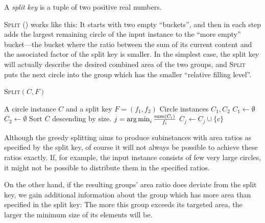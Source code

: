 \documentclass[a4paper,style=print,bibliography=totoc,nexus,lnum,extramargin]{tubsbook}
\begin{document}
\begin{definition}
    A \emph{split key} is a tuple of two positive real numbers.
\end{definition}

\textsc{Split} () works like this: It starts with two empty “buckets”, and then in each step adds the largest remaining circle of the input instance to the “more empty” bucket---the bucket where the ratio between the sum of its current content and the associated factor of the split key is smaller.
In the simplest case, the split key will actually describe the desired combined area of the two groups, and \textsc{Split} puts the next circle into the group which has the smaller “relative filling level”.

\begin{algorithm}
    \caption{\textsc{Split}$(C,F)$}
    \label{alg:split}
    \begin{algorithmic}
        \Require A circle instance $C$ and a split key $F = (f_1, f_2)$
        \Ensure Circle instances $C_1, C_2$
        \State $C_1 \gets \emptyset$
        \State $C_2 \gets \emptyset$
        \State Sort $C$ descending by size.
            \State $j = \operatorname*{arg\,min}_{i} \frac{\operatorname{sum}(C_i)}{f_i}$
            \State $C_j \gets C_j \cup \{c\}$
        \EndFor
    \end{algorithmic}
\end{algorithm}

Although the greedy splitting aims to produce subinstances with area ratios as specified by the split key, of course it will not always be possible to achieve these ratios exactly. If, for example, the input instance consists of few very large circles, it might not be possible to distribute them in the specified ratios.

On the other hand, if the resulting groups' area ratio does deviate from the split key, we gain additional information about the group which has more area than specified in the split key: The more this group exceeds its targeted area, the larger the minimum size of its elements will be.
\end{document}
